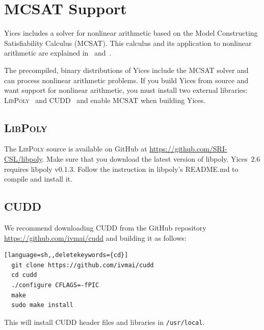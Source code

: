 \documentclass[11pt,twoside,fleqn,openright,titlepage]{cslreport}
\begin{document}
\section{MCSAT Support}
\label{mcsat-install}

Yices includes a solver for nonlinear arithmetic based on the Model
Constructing Satisfiability Calculus (MCSAT). This calculus and its
application to nonlinear arithmetic are explained
in~\cite{Jovanovic-etal:MCSATb:2013}
and~\cite{deMouraJovanovic:nla:2012}.

\medskip\noindent
The precompiled, binary distributions of Yices include the MCSAT
solver and can process nonlinear arithmetic problems. If you build
Yices from source and want support for nonlinear arithmetic, you must
install two external libraries: \textsc{LibPoly}~\cite{Jovanovic+Dutertre:libpoly:2017}
and CUDD~\cite{Somenzi:cudd:1998} and enable MCSAT when building Yices.

\subsection*{\textsc{LibPoly}}

The \textsc{LibPoly} source is available on GitHub
at \url{https://github.com/SRI-CSL/libpoly}. Make sure that you
download the latest version of libpoly. Yices~2.6 requires libpoly
v0.1.3. Follow the instruction in libpoly's README.md to compile and
install it.

\subsection*{CUDD}

We recommend downloading CUDD from the GitHub repository
\url{https://github.com/ivmai/cudd} and building it as follows:
\begin{small}
\begin{lstlisting}[language=sh,,deletekeywords={cd}]
  git clone https://github.com/ivmai/cudd
  cd cudd
  ./configure CFLAGS=-fPIC
  make
  sudo make install
\end{lstlisting}
\end{small}
This will install CUDD header files and libraries in \texttt{/usr/local}.
\end{document}
